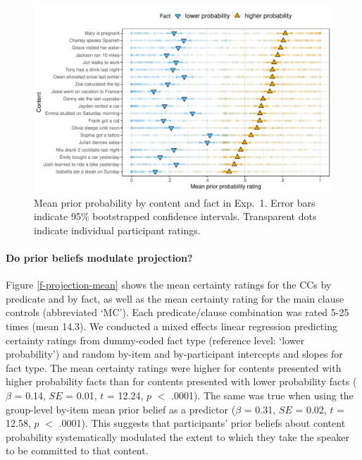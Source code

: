 \documentclass[OpenMind]{stjour}
\begin{document}
\begin{figure}[h!]
\centering
\includegraphics[width=\textwidth]{../../results/9-prior-projection/graphs/prior-ratings}

\caption{Mean prior probability by content and fact in Exp.~1. Error bars indicate 95\% bootstrapped confidence intervals. Transparent dots indicate individual participant ratings.} 
\label{f-prior}
\end{figure}

\paragraph{Do prior beliefs modulate projection?}  Figure \ref{f-projection-mean} shows the mean certainty ratings for the CCs by  predicate and by fact, as well as the mean certainty rating for the main clause controls (abbreviated `MC'). Each predicate/clause combination was rated 5-25 times (mean 14.3). We conducted a mixed effects linear regression predicting certainty ratings from dummy-coded fact type (reference level: `lower probability') and random by-item and by-participant intercepts and slopes for fact type. The mean certainty ratings were higher for contents  presented with higher probability facts than for contents presented with lower probability facts ($\beta$ = 0.14, $SE$ = 0.01, $t$ = 12.24, $p$ $<$ .0001).   The same was true when using the group-level by-item mean prior belief as a predictor  ($\beta$ = 0.31, $SE$ = 0.02, $t$ = 12.58, $p$ $<$ .0001).   This suggests that participants' prior beliefs about content probability systematically modulated the extent to which they take the speaker to be committed to that content.
\end{document}
